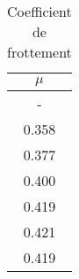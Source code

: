 \begin{table}
\centering
\begin{tabular}{|c|}
\hline
$\mu$ \\
\hline
- \\
\hline
0.358 \\
\hline
0.377 \\
\hline
0.400 \\
\hline
0.419 \\
\hline
0.421 \\
\hline
0.419 \\
\hline
\end{tabular}
\caption{Coefficient de frottement}
\label{table:coeffbp}
\end{table}
